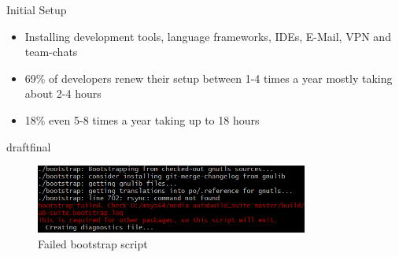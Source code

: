\documentclass{beamer}
\def\final{final}
\def\status{draft}
\begin{document}
\begin{frame}{}
  \vspace{-0.2cm}
  \begin{center}
    \Large Initial Setup
  \end{center}

  \vspace{-0.2cm}
  \begin{block}{}
    \begin{itemize}
      \small
      \setlength\itemsep{.6em}
      \item Installing development tools, language frameworks, IDEs, E-Mail, VPN and team-chats
      \item 69\% of developers renew their setup between 1-4 times a year mostly taking about 2-4 hours
      \item 18\% even 5-8 times a year taking up to 18 hours
    \end{itemize}
  \end{block}

  \ifx\status\final{}
    \pause{}
  \fi

  \vspace{0.4cm}
  \begin{figure}
    \includegraphics[width=0.8\textwidth]{img/terminal_small.png}
    \caption{Failed bootstrap script}
  \end{figure}

\end{frame}
\end{document}
